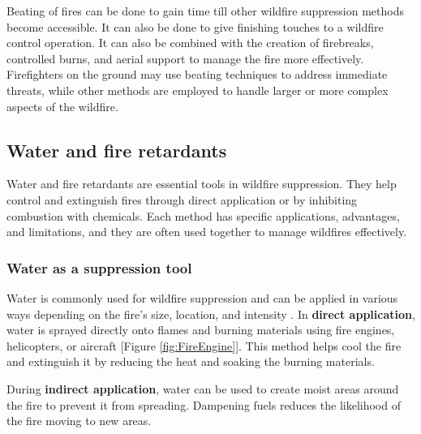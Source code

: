 \documentclass[
  12 pt,
]{Nemilov}
\begin{document}
Beating of fires can be done to gain time till other wildfire suppression methods become accessible. It can also be done to give finishing touches to a wildfire control operation. It can also be combined with the creation of firebreaks, controlled burns, and aerial support to manage the fire more effectively. Firefighters on the ground may use beating techniques to address immediate threats, while other methods are employed to handle larger or more complex aspects of the wildfire.

\subsection{Water and fire retardants}\label{water-and-fire-retardants}

Water and fire retardants are essential tools in wildfire suppression. They help control and extinguish fires through direct application or by inhibiting combustion with chemicals. Each method has specific applications, advantages, and limitations, and they are often used together to manage wildfires effectively.

\subsubsection{Water as a suppression tool}\label{water-as-a-suppression-tool}

Water is commonly used for wildfire suppression and can be applied in various ways depending on the fire's size, location, and intensity \citep{grant2000fire, hua2002numerical, mawhinney1994closer}. In \textbf{direct application}, water is sprayed directly onto flames and burning materials using fire engines, helicopters, or aircraft {[}Figure \ref{fig:FireEngine}{]}. This method helps cool the fire and extinguish it by reducing the heat and soaking the burning materials.

During \textbf{indirect application}, water can be used to create moist areas around the fire to prevent it from spreading. Dampening fuels reduces the likelihood of the fire moving to new areas.
\end{document}
